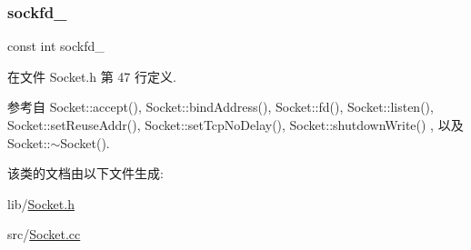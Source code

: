 \subsubsection{\texorpdfstring{sockfd\+\_\+}{sockfd\_}}
{\footnotesize\ttfamily const int sockfd\+\_\+\hspace{0.3cm}{\ttfamily [private]}}



在文件 Socket.\+h 第 47 行定义.



参考自 Socket\+::accept(), Socket\+::bind\+Address(), Socket\+::fd(), Socket\+::listen(), Socket\+::set\+Reuse\+Addr(), Socket\+::set\+Tcp\+No\+Delay(), Socket\+::shutdown\+Write() , 以及 Socket\+::$\sim$\+Socket().



该类的文档由以下文件生成\+:\begin{DoxyCompactItemize}
\item 
lib/\hyperlink{Socket_8h}{Socket.\+h}\item 
src/\hyperlink{Socket_8cc}{Socket.\+cc}\end{DoxyCompactItemize}
